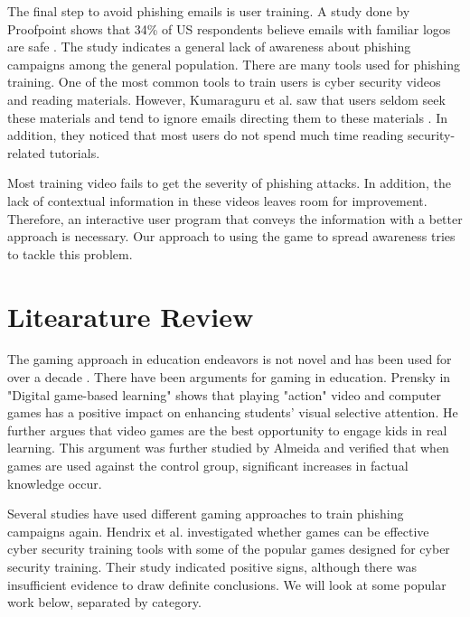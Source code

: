 The final step to avoid phishing emails is user training. A study done by Proofpoint shows that 34\% of US respondents believe emails with familiar logos are safe \cite{proofpoint}. The study indicates a general lack of awareness about phishing campaigns among the general population. There are many tools used for phishing training. One of the most common tools to train users is cyber security videos and reading materials. However,  Kumaraguru et al. saw that users seldom seek these materials and tend to ignore emails directing them to these materials \cite{johnny_phishing}. In addition, they noticed that most users do not spend much time reading security-related tutorials.

Most training video fails to get the severity of phishing attacks. In addition, the lack of contextual information in these videos leaves room for improvement. Therefore, an interactive user program that conveys the information with a better approach is necessary. Our approach to using the game to spread awareness tries to tackle this problem.

\section{Litearature Review}
The gaming approach in education endeavors is not novel and has been used for over a decade \cite{almeida_2012}. There have been arguments for gaming in education. Prensky \cite{prensky} in "Digital game-based learning" shows that playing "action" video and computer games has a positive impact on enhancing students' visual selective attention. He further argues that video games are the best opportunity to engage kids in real learning. This argument was further studied by Almeida \cite{almeida_2012} and verified that when games are used against the control group, significant increases in factual knowledge occur.

Several studies have used different gaming approaches to train phishing campaigns again. Hendrix et al. \cite{hendrix_al_sherbaz_bloom_2016} investigated whether games can be effective cyber security training tools with some of the popular games designed for cyber security training. Their study indicated positive signs, although there was insufficient evidence to draw definite conclusions. We will look at some popular work below, separated by category.

